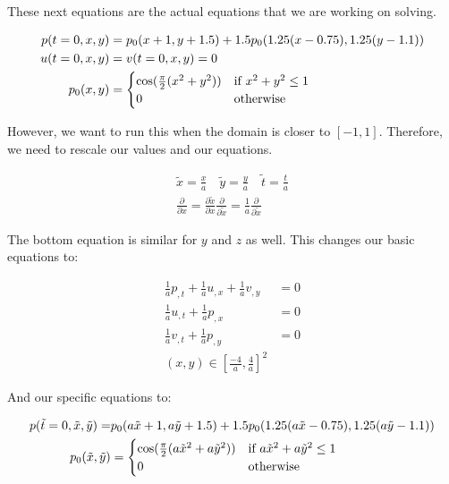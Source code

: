 \documentclass[12pt]{article}
\begin{document}
These next equations are the actual equations that we are working on solving.

\begin{align*}
p(t = 0, x, y) & = p_0(x + 1, y + 1.5) + 1.5p_0(1.25(x - 0.75), 1.25(y - 1.1)) \\
u(t = 0, x, y) & = v(t = 0, x, y) = 0 \\
p_0(x, y) & = 
\begin{cases}
\cos(\frac{\pi}{2}(x^2 + y^2)) & \text{if } x^2 + y^2 \leq 1 \\
0 & \mbox{\text{otherwise} }
\end{cases}
\end{align*}

However, we want to run this when the domain is closer to $[-1, 1]$. Therefore, we need to rescale our values and our equations.

\begin{align*}
\tilde{x} = \frac{x}{a} \quad
\tilde{y} = \frac{y}{a} \quad
\tilde{t} = \frac{t}{a} \\
\frac{\partial}{\partial x} = \frac{\partial \tilde{x}}{\partial x} \frac{\partial}{\partial \tilde{x}} = \frac{1}{a} \frac{\partial}{\partial \tilde{x}}
\end{align*}

The bottom equation is similar for $y$ and $z$ as well. This changes our basic equations to: 

\begin{align*}
\frac{1}{a}p_{,t} + \frac{1}{a}u_{,x} + \frac{1}{a}v_{,y} &= 0 \\
\frac{1}{a}u_{,t} + \frac{1}{a}p_{,x} &= 0 \\
\frac{1}{a}v_{,t} + \frac{1}{a}p_{,y} &= 0 \\
(x, y) \in \left[\frac{-4}{a}, \frac{4}{a}\right]^2
\end{align*}

And our specific equations to:

\begin{align*}
p(\tilde{t} = 0, \tilde{x}, \tilde{y}) = &p_0(a\tilde{x} + 1, a\tilde{y} + 1.5) + 1.5p_0(1.25(a\tilde{x} - 0.75), 1.25(a\tilde{y} - 1.1)) \\
p_0(\tilde{x}, \tilde{y}) &= 
\begin{cases}
\cos(\frac{\pi}{2}(a\tilde{x}^2 + a\tilde{y}^2)) & \text{if } a\tilde{x}^2 + a\tilde{y}^2 \leq 1 \\
0 & \mbox{\text{otherwise} }
\end{cases}
\end{align*}
\end{document}
